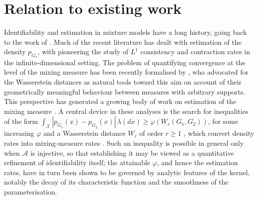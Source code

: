 \documentclass[11pt,twoside]{article} %
\begin{document}
\section{Relation to existing work}\label{sec:literature}
Identifiability and estimation in mixture models have a long history, going back
to the work of
\cite{teicher1960mixture,teicher1961identifiability,teicher1963finite}. Much of
the recent literature has dealt with estimation of the density $p_{G_*}$,
with \cite{Ghosal-1999,Barron-Shervish-Wasserman-99,Ghosal-2000,Ghosal-2001}
pioneering the study of $L^1$ consistency and contraction rates in the
infinite-dimensional setting. The problem of quantifying convergence at the
level of the mixing measure has been recently formalised by \cite{Nguyen-13}, who
advocated for the Wasserstein distances as natural tools toward this aim on
account of their geometrically meaningful behaviour between measures with
arbitrary supports. This perspective has generated a growing body of work on estimation of the mixing measure
\citep{Ho-Nguyen-Ann-16,Ho-Nguyen-EJS-16,Gao2016Posterior,scricciolo2018bayes,rousseau2024wasserstein,bariletto2026convergence,ascolani2026posterior}.
A central device in these analyses is the search for inequalities of the form
$\int_\mathcal X |p_{G_1}(x)-p_{G_2}(x)|\,\lambda(dx)\ge \varphi(W_r(G_1,G_2))$,
for some increasing $\varphi$ and a Wasserstein distance $W_r$ of order $r\geq 1$ \citep[see][for a definition when $r>1$]{Villani-09}, which convert density rates into mixing-measure rates
\citep{nguyen2026optimal}. Such an inequality is possible in general only when
$\mathcal A$ is injective, so that establishing it may be viewed as a
quantitative refinement of identifiability itself; the attainable $\varphi$, and hence the
estimation rates, have in turn been shown to be governed by analytic features of
the kernel, notably the decay of its characteristic function and the smoothness
of the parameterisation.
\end{document}

